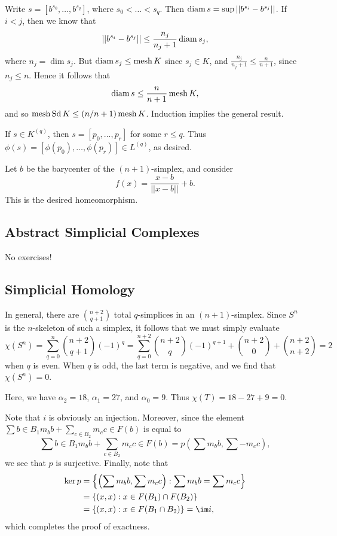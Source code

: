 \documentclass[../../solutions.tex]{subfiles}
\begin{document}
\begin{exercise} \leavevmode
Write $s=[b^{s_0},\dots,b^{s_q}]$, where $s_0<\dots<s_q$.
Then $\operatorname{diam} s=\sup||b^{s_i}-b^{s_j}||$.
If $i<j$, then we know that
\[||b^{s_i}-b^{s_j}||\le\frac{n_j}{n_j+1}\operatorname{diam} s_j,\]
where $n_j=\dim s_j$.
But $\operatorname{diam} s_j\le\operatorname{mesh} K$ since $s_j\in K$, and $\frac{n_j}{n_j+1}\le\frac{n}{n+1}$, since $n_j\le n$.
Hence it follows that
\[\operatorname{diam} s\le\frac n{n+1}\operatorname{mesh} K,\]
and so $\operatorname{mesh}\operatorname{Sd} K\le(n/n+1)\operatorname{mesh} K$.
Induction implies the general result.
\end{exercise}

\begin{exercise} \leavevmode
If $s\in K^{(q)}$, then $s=[p_0,\dots,p_r]$ for some $r\le q$.
Thus $\phi(s)=[\phi(p_0),\dots,\phi(p_r)]\in L^{(q)}$, as desired.
\end{exercise}

\begin{exercise} \leavevmode
Let $b$ be the barycenter of the $(n+1)$-simplex, and consider
\[f(x)=\frac{x-b}{||x-b||}+b.\]
This is the desired homeomorphism.
\end{exercise}

\subsection{Abstract Simplicial Complexes}
No exercises!

\subsection{Simplicial Homology}
\begin{exercise} \leavevmode
In general, there are $\binom{n+2}{q+1}$ total $q$-simplices in an $(n+1)$-simplex.
Since $S^n$ is the $n$-skeleton of such a simplex, it follows that we must simply evaluate
\[\chi(S^n)=\sum_{q=0}^n\binom{n+2}{q+1}(-1)^q=\sum_{q=0}^{n+2}\binom{n+2}q(-1)^{q+1}+\binom{n+2}0+\binom{n+2}{n+2}=2\]
when $q$ is even.
When $q$ is odd, the last term is negative, and we find that $\chi(S^n)=0$.
\end{exercise}

\begin{exercise} \leavevmode
Here, we have $\alpha_2=18$, $\alpha_1=27$, and $\alpha_0=9$.
Thus $\chi(T)=18-27+9=0$.
\end{exercise}

\begin{exercise} \leavevmode
Note that $i$ is obviously an injection.
Moreover, since the element $\sum{b\in B_1}m_bb+\sum_{c\in B_2}m_cc\in F(b)$ is equal to
\[\sum{b\in B_1}m_bb+\sum_{c\in B_2}m_cc\in F(b)=p\left(\sum m_bb,\sum-m_cc\right),\]
we see that $p$ is surjective.
Finally, note that
\begin{align*}
\ker p&=\left\{\left(\sum m_bb,\sum m_cc\right):\sum m_bb=\sum m_cc\right\}\\
&=\{(x,x):x\in F(B_1)\cap F(B_2)\}\\
&=\{(x,x):x\in F(B_1\cap B_2)\}=\im i,
\end{align*}
which completes the proof of exactness.
\end{exercise}
\end{document}
